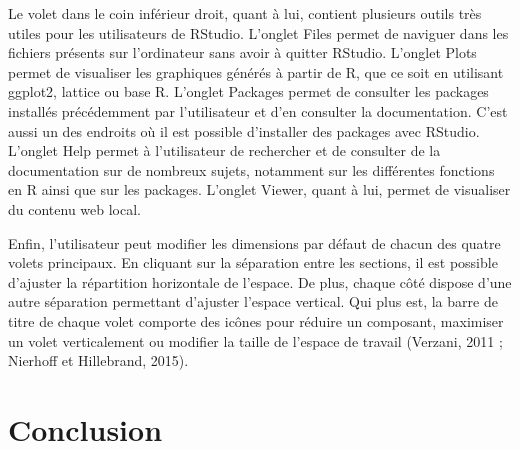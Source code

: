 \documentclass[
  letterpaper,
  DIV=11,
  numbers=noendperiod]{scrreprt}
\begin{document}
Le volet dans le coin inférieur droit, quant à lui, contient plusieurs
outils très utiles pour les utilisateurs de RStudio. L'onglet Files
permet de naviguer dans les fichiers présents sur l'ordinateur sans
avoir à quitter RStudio. L'onglet Plots permet de visualiser les
graphiques générés à partir de R, que ce soit en utilisant ggplot2,
lattice ou base R. L'onglet Packages permet de consulter les packages
installés précédemment par l'utilisateur et d'en consulter la
documentation. C'est aussi un des endroits où il est possible
d'installer des packages avec RStudio. L'onglet Help permet à
l'utilisateur de rechercher et de consulter de la documentation sur de
nombreux sujets, notamment sur les différentes fonctions en R ainsi que
sur les packages. L'onglet Viewer, quant à lui, permet de visualiser du
contenu web local.

Enfin, l'utilisateur peut modifier les dimensions par défaut de chacun
des quatre volets principaux. En cliquant sur la séparation entre les
sections, il est possible d'ajuster la répartition horizontale de
l'espace. De plus, chaque côté dispose d'une autre séparation permettant
d'ajuster l'espace vertical. Qui plus est, la barre de titre de chaque
volet comporte des icônes pour réduire un composant, maximiser un volet
verticalement ou modifier la taille de l'espace de travail (Verzani,
2011 ; Nierhoff et Hillebrand, 2015).

\section{Conclusion}\label{conclusion-1}
\end{document}
